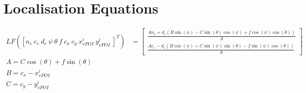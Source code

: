 \section{Localisation Equations}
\begin{align*}
LF\left([n_c\ e_c\ d_c\ \psi\ \theta\ f\ c_x\ c_y\ x^i_{vPOI}\ y^i_{vPOI}\ ]^T\right) &=\left[\begin{matrix}\frac{A n_{c} + d_{c} \left(B \sin{\left(\psi \right)} - C \sin{\left(\theta \right)} \cos{\left(\psi \right)} + f \cos{\left(\psi \right)} \cos{\left(\theta \right)}\right)}{A}\\\frac{A e_{c} - d_{c} \left(B \cos{\left(\psi \right)} + C \sin{\left(\psi \right)} \sin{\left(\theta \right)} - f \sin{\left(\psi \right)} \cos{\left(\theta \right)}\right)}{A}\end{matrix}\right] \\
A = C \cos{\left(\theta \right)} + f \sin{\left(\theta \right)} \\
B = c_{x} - x^i_{vPOI} \\
C = c_{y} - y^i_{vPOI} \\
\end{align*}
